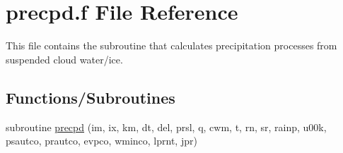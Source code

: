 \hypertarget{precpd_8f}{}\section{precpd.\+f File Reference}
\label{precpd_8f}


This file contains the subroutine that calculates precipitation processes from suspended cloud water/ice.  


\subsection*{Functions/\+Subroutines}
\textbf{ }\par
\begin{DoxyCompactItemize}
\item 
subroutine \hyperlink{group__precip_ga5b7dbb93ea6f466ef61be5b331cbc265}{precpd} (im, ix, km, dt, del, prsl, q, cwm, t, rn, sr, rainp, u00k, psautco, prautco, evpco, wminco, lprnt, jpr)
\end{DoxyCompactItemize}

